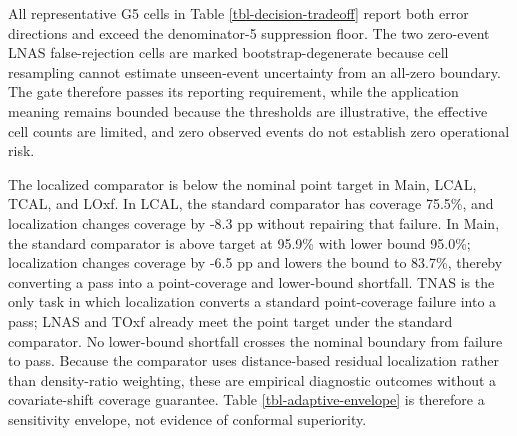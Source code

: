 \documentclass[
  number,
  preprint]{elsarticle}
\begin{document}
All representative G5 cells in Table \ref{tbl-decision-tradeoff} report
both error directions and exceed the denominator-5 suppression floor.
The two zero-event LNAS false-rejection cells are marked
bootstrap-degenerate because cell resampling cannot estimate
unseen-event uncertainty from an all-zero boundary. The gate therefore
passes its reporting requirement, while the application meaning remains
bounded because the thresholds are illustrative, the effective cell
counts are limited, and zero observed events do not establish zero
operational risk.

The localized comparator is below the nominal point target in Main,
LCAL, TCAL, and LOxf. In LCAL, the standard comparator has coverage
75.5\%, and localization changes coverage by -8.3 pp without repairing
that failure. In Main, the standard comparator is above target at 95.9\%
with lower bound 95.0\%; localization changes coverage by -6.5 pp and
lowers the bound to 83.7\%, thereby converting a pass into a
point-coverage and lower-bound shortfall. TNAS is the only task in which
localization converts a standard point-coverage failure into a pass;
LNAS and TOxf already meet the point target under the standard
comparator. No lower-bound shortfall crosses the nominal boundary from
failure to pass. Because the comparator uses distance-based residual
localization rather than density-ratio weighting, these are empirical
diagnostic outcomes without a covariate-shift coverage guarantee. Table
\ref{tbl-adaptive-envelope} is therefore a sensitivity envelope, not
evidence of conformal superiority.
\end{document}

